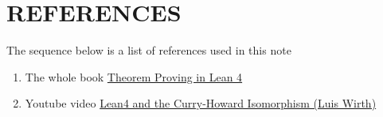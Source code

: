 \chapter{REFERENCES}

The sequence below is a list of references used in this note

\begin{enumerate}
	\item The whole book \href{https://lean-lang.org/theorem_proving_in_lean4/}{Theorem Proving in Lean 4}
	
	\item Youtube video \href{https://youtu.be/Sy_4z751YWI}{Lean4 and the Curry-Howard Isomorphism (Luis Wirth)}
\end{enumerate}